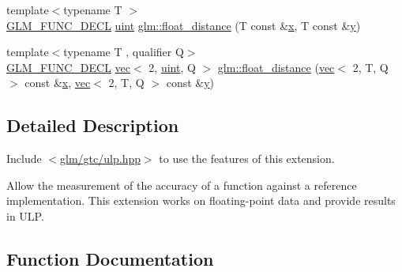 \begin{DoxyCompactItemize}
{\footnotesize template$<$typename T $>$ }\\\mbox{\hyperlink{setup_8hpp_ab2d052de21a70539923e9bcbf6e83a51}{G\+L\+M\+\_\+\+F\+U\+N\+C\+\_\+\+D\+E\+CL}} \mbox{\hyperlink{group__core__precision_ga4fd29415871152bfb5abd588334147c8}{uint}} \mbox{\hyperlink{group__gtc__ulp_ga2e09bd6c8b0a9c91f6f5683d68245634}{glm\+::float\+\_\+distance}} (T const \&\mbox{\hyperlink{_s_d_l__opengl_8h_ad0e63d0edcdbd3d79554076bf309fd47}{x}}, T const \&\mbox{\hyperlink{_s_d_l__opengl_8h_a1675d9d7bb68e1657ff028643b4037e3}{y}})
\item 
{\footnotesize template$<$typename T , qualifier Q$>$ }\\\mbox{\hyperlink{setup_8hpp_ab2d052de21a70539923e9bcbf6e83a51}{G\+L\+M\+\_\+\+F\+U\+N\+C\+\_\+\+D\+E\+CL}} \mbox{\hyperlink{structglm_1_1vec}{vec}}$<$ 2, \mbox{\hyperlink{group__core__precision_ga4fd29415871152bfb5abd588334147c8}{uint}}, Q $>$ \mbox{\hyperlink{group__gtc__ulp_ga72b3223069013f336d8c31812b7ada80}{glm\+::float\+\_\+distance}} (\mbox{\hyperlink{structglm_1_1vec}{vec}}$<$ 2, T, Q $>$ const \&\mbox{\hyperlink{_s_d_l__opengl_8h_ad0e63d0edcdbd3d79554076bf309fd47}{x}}, \mbox{\hyperlink{structglm_1_1vec}{vec}}$<$ 2, T, Q $>$ const \&\mbox{\hyperlink{_s_d_l__opengl_8h_a1675d9d7bb68e1657ff028643b4037e3}{y}})
\end{DoxyCompactItemize}


\subsection{Detailed Description}
Include $<$\mbox{\hyperlink{ulp_8hpp}{glm/gtc/ulp.\+hpp}}$>$ to use the features of this extension.

Allow the measurement of the accuracy of a function against a reference implementation. This extension works on floating-\/point data and provide results in U\+LP. 

\subsection{Function Documentation}
\mbox{\label{group__gtc__ulp_ga2e09bd6c8b0a9c91f6f5683d68245634}} 
